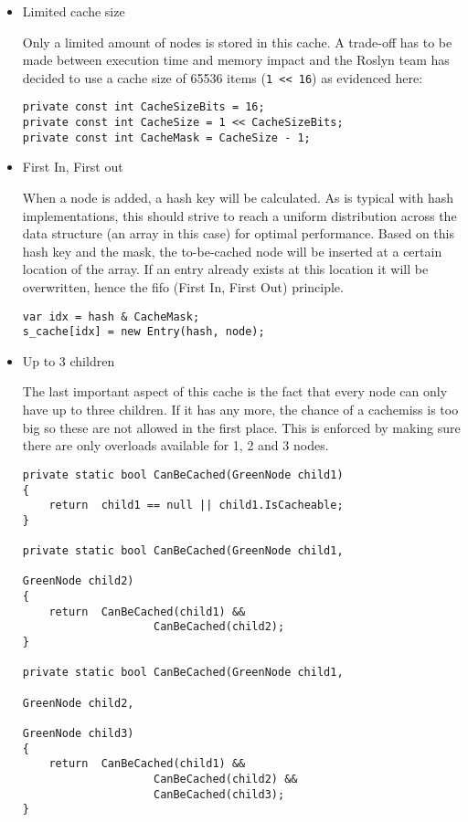 \begin{itemize}

\item Limited cache size

Only a limited amount of nodes is stored in this cache. A trade-off has to be made between execution time and memory impact and the Roslyn team has decided to use a cache size of 65536 items (\texttt{1 << 16}) as evidenced here:

\begin{lstlisting}
private const int CacheSizeBits = 16;
private const int CacheSize = 1 << CacheSizeBits;
private const int CacheMask = CacheSize - 1;
\end{lstlisting}

\item First In, First out

When a node is added, a hash key will be calculated. As is typical with hash implementations, this should strive to reach a uniform distribution across the data structure (an array in this case) for optimal performance. Based on this hash key and the mask, the to-be-cached node will be inserted at a certain location of the array. If an entry already exists at this location it will be overwritten, hence the \gls{fifo} (First In, First Out) principle.

\begin{lstlisting}
var idx = hash & CacheMask;
s_cache[idx] = new Entry(hash, node);
\end{lstlisting}

\item Up to 3 children

The last important aspect of this cache is the fact that every node can only have up to three children. If it has any more, the chance of a \gls{cachemiss} is too big\parencite{Sadov2014} so these are not allowed in the first place. This is enforced by making sure there are only overloads available for 1, 2 and 3 nodes.

\begin{lstlisting}
private static bool CanBeCached(GreenNode child1)
{
	return 	child1 == null || child1.IsCacheable;
}

private static bool CanBeCached(GreenNode child1, 
																GreenNode child2)
{
	return 	CanBeCached(child1) && 
					CanBeCached(child2);
}

private static bool CanBeCached(GreenNode child1, 
																GreenNode child2, 
																GreenNode child3)
{
	return 	CanBeCached(child1) && 
					CanBeCached(child2) && 
					CanBeCached(child3);
}
\end{lstlisting}

\end{itemize}

